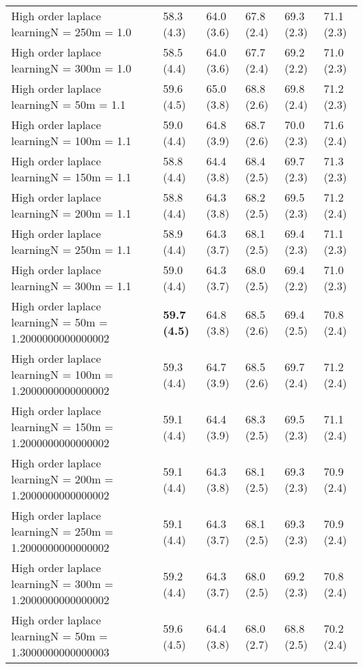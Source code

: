 \documentclass{article}
\begin{document}
\begin{table*}[t!]
\begin{center}
\begin{small}
\begin{sc}
\begin{tabular}{llllll}
High order laplace learningN = 250m = 1.0&58.3 (4.3)      &64.0 (3.6)      &67.8 (2.4)      &69.3 (2.3)      &71.1 (2.3)      \\
High order laplace learningN = 300m = 1.0&58.5 (4.4)      &64.0 (3.6)      &67.7 (2.4)      &69.2 (2.2)      &71.0 (2.3)      \\
High order laplace learningN = 50m = 1.1&59.6 (4.5)      &65.0 (3.8)      &68.8 (2.6)      &69.8 (2.4)      &71.2 (2.3)      \\
High order laplace learningN = 100m = 1.1&59.0 (4.4)      &64.8 (3.9)      &68.7 (2.6)      &70.0 (2.3)      &71.6 (2.4)      \\
High order laplace learningN = 150m = 1.1&58.8 (4.4)      &64.4 (3.8)      &68.4 (2.5)      &69.7 (2.3)      &71.3 (2.3)      \\
High order laplace learningN = 200m = 1.1&58.8 (4.4)      &64.3 (3.8)      &68.2 (2.5)      &69.5 (2.3)      &71.2 (2.4)      \\
High order laplace learningN = 250m = 1.1&58.9 (4.4)      &64.3 (3.7)      &68.1 (2.5)      &69.4 (2.3)      &71.1 (2.3)      \\
High order laplace learningN = 300m = 1.1&59.0 (4.4)      &64.3 (3.7)      &68.0 (2.5)      &69.4 (2.2)      &71.0 (2.3)      \\
High order laplace learningN = 50m = 1.2000000000000002&{\bf 59.7 (4.5)}&64.8 (3.8)      &68.5 (2.6)      &69.4 (2.5)      &70.8 (2.4)      \\
High order laplace learningN = 100m = 1.2000000000000002&59.3 (4.4)      &64.7 (3.9)      &68.5 (2.6)      &69.7 (2.4)      &71.2 (2.4)      \\
High order laplace learningN = 150m = 1.2000000000000002&59.1 (4.4)      &64.4 (3.9)      &68.3 (2.5)      &69.5 (2.3)      &71.1 (2.4)      \\
High order laplace learningN = 200m = 1.2000000000000002&59.1 (4.4)      &64.3 (3.8)      &68.1 (2.5)      &69.3 (2.3)      &70.9 (2.4)      \\
High order laplace learningN = 250m = 1.2000000000000002&59.1 (4.4)      &64.3 (3.7)      &68.1 (2.5)      &69.3 (2.3)      &70.9 (2.4)      \\
High order laplace learningN = 300m = 1.2000000000000002&59.2 (4.4)      &64.3 (3.7)      &68.0 (2.5)      &69.2 (2.3)      &70.8 (2.4)      \\
High order laplace learningN = 50m = 1.3000000000000003&59.6 (4.5)      &64.4 (3.8)      &68.0 (2.7)      &68.8 (2.5)      &70.2 (2.4)      \\

\end{tabular}
\end{sc}
\end{small}
\end{center}
\end{table*}
\end{document}
